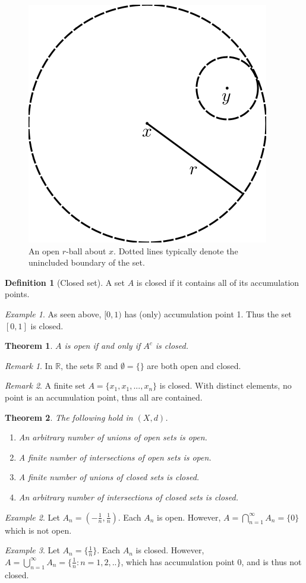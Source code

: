 \documentclass[11pt]{article}
\newcommand{\R}{\ensuremath{\mathbb R}}
\theoremstyle{plain}
\newtheorem{thm}{Theorem}[section]
\theoremstyle{definition}
\newtheorem{defi}{Definition}[section]
\theoremstyle{remark}
\newtheorem{exm}{Example}[section]
\newtheorem{rem}{Remark}[section]
\begin{document}
\begin{figure}
    \centering
    \includegraphics[width=0.5\linewidth]{figures/open_ball.png}
    \caption{An open $r$-ball about $x$. Dotted lines typically denote the unincluded boundary of the set.}
\end{figure}
\begin{defi}[Closed set]
    A set $A$ is closed if it contains all of its accumulation points.
\end{defi}
\begin{exm}
    As seen above, $[0,1)$ has (only) accumulation point 1. Thus the set $[0,1]$ is closed.
\end{exm}
\begin{thm}
    $A$ is open if and only if $A^c$ is closed.
\end{thm}
\begin{rem}
    In $\R$, the sets $\R$ and $\emptyset = \{\}$ are both open and closed.
\end{rem}
\begin{rem}
    A finite set $A = \{x_1, x_1, ..., x_n\}$ is closed. With distinct elements, no point is an accumulation point, thus all are contained.
\end{rem}
\begin{thm}
    The following hold in $(X,d)$.
    \begin{enumerate}
        \item An arbitrary number of unions of open sets is open.
        \item A finite number of intersections of open sets is open.
        \item A finite number of unions of closed sets is closed.
        \item An arbitrary number of intersections of closed sets is closed.
    \end{enumerate}
\end{thm}
\begin{exm}
    Let $A_n = (-\frac{1}{n}, \frac{1}{n})$. Each $A_n$ is open. However, $A = \bigcap_{n=1}^\infty A_n = \{0\}$ which is not open.
\end{exm}
\begin{exm}
    Let $A_n = \{\frac{1}{n}\}$. Each $A_n$ is closed. However, $A = \bigcup_{n=1}^\infty A_n = \{\frac{1}{n} : n = 1, 2, ..\}$, which has accumulation point 0, and is thus not closed. 
\end{exm}
\end{document}
